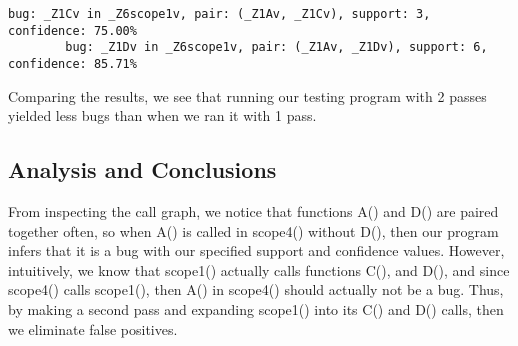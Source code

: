 \documentclass{article}
\begin{document}
\begin{enumerate}[(a)]
      \begin{lstlisting}[basicstyle=\small\ttfamily]
        bug: _Z1Cv in _Z6scope1v, pair: (_Z1Av, _Z1Cv), support: 3, confidence: 75.00%
        bug: _Z1Dv in _Z6scope1v, pair: (_Z1Av, _Z1Dv), support: 6, confidence: 85.71%
      \end{lstlisting}

      Comparing the results, we see that running our testing program with 2 passes yielded less bugs than when we ran it with 1 pass.

      \subsection*{Analysis and Conclusions}
      From inspecting the call graph, we notice that functions A() and D() are paired together often, so when A() is called in scope4() without D(), then our program infers that it is a bug with our specified support and confidence values. However, intuitively, we know that scope1() actually calls functions C(), and D(), and since scope4() calls scope1(), then A() in scope4() should actually not be a bug. Thus, by making a second pass and expanding scope1() into its C() and D() calls, then we eliminate false positives.

  \end{enumerate}
\end{document}

